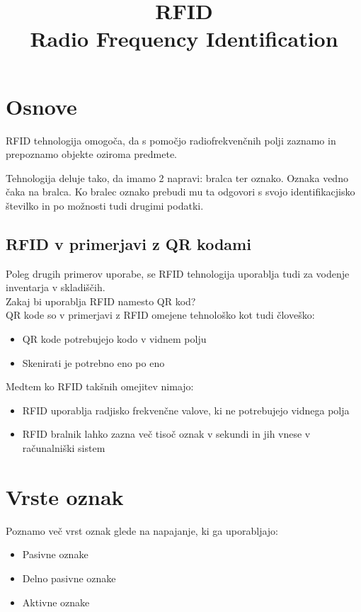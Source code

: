 \documentclass[]{article}
\title{RFID \\
       \large Radio Frequency Identification}
\date{}
\begin{document}
\maketitle

\clearpage

\tableofcontents

\clearpage

\section{Osnove}
RFID tehnologija omogo\v{c}a, da s pomo\v{c}jo
radiofrekven\v{c}nih polji zaznamo in prepoznamo objekte oziroma
predmete.

Tehnologija deluje tako, da imamo 2 napravi: bralca ter oznako.
Oznaka vedno \v{c}aka na bralca. Ko bralec oznako prebudi
mu ta odgovori s svojo identifikacjisko \v{s}tevilko in po
mo\v{z}nosti tudi drugimi podatki.


\subsection{RFID v primerjavi z QR kodami}
Poleg drugih primerov uporabe, se RFID tehnologija uporablja
tudi za vodenje inventarja v skladi\v{s}\v{c}ih. \\

\noindent
Zakaj bi uporablja RFID namesto QR kod? \\
QR kode so v primerjavi z RFID omejene tehnolo\v{s}ko kot tudi
\v{c}love\v{s}ko:
\begin{itemize}
  \item QR kode potrebujejo kodo v vidnem polju
  \item Skenirati je potrebno eno po eno
\end{itemize}

\noindent
Medtem ko RFID tak\v{s}nih omejitev nimajo:
\begin{itemize}
    \item RFID uporablja radjisko frekven\v{c}ne valove, ki ne
      potrebujejo vidnega polja
    \item RFID bralnik lahko zazna ve\v{c} tiso\v{c} oznak v
      sekundi in jih vnese v ra\v{c}unalni\v{s}ki sistem
\end{itemize}

\section{Vrste oznak}
Poznamo ve\v{c} vrst oznak glede na napajanje, ki ga uporabljajo:
\begin{itemize}
  \item Pasivne oznake
  \item Delno pasivne oznake
  \item Aktivne oznake
\end{itemize}
\end{document}
